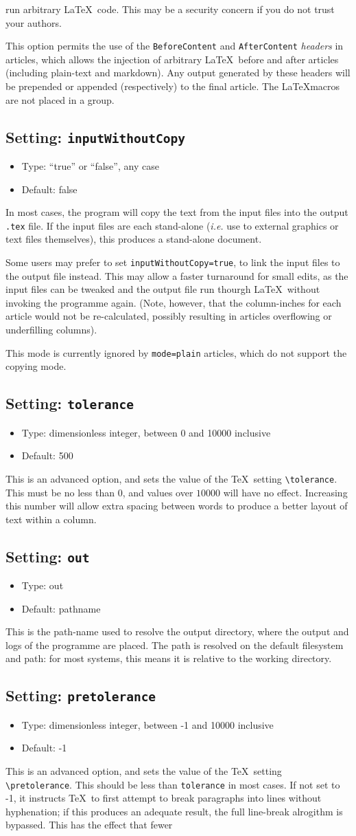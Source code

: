\documentclass[a4paper,DIV=11]{scrartcl}
\newcommand{\property}[5]{
  \subsection{#1: \texttt{#2}}
  \begin{itemize}
  \item Type: #3
  \item Default: #4
  \end{itemize}
  #5
}
\newcommand{\setting}{\property{Setting}}
\begin{document}
\begin{multicols}{2}
{  run arbitrary \LaTeX\ code. This may be a security concern if you do
  not trust your authors.\par
  This option permits the use of the \texttt{BeforeContent} and
  \texttt{AfterContent} \textit{headers} in articles, which allows the
  injection of arbitrary \LaTeX\ before and after articles (including
  plain-text and markdown). Any output generated by these headers will
  be prepended or appended (respectively) to the final article. The
  \LaTeX macros are not placed in a group.
}
\setting{inputWithoutCopy}{``true'' or ``false'', any case}{false}{
  In most cases, the program will copy the text from the input files
  into the output \texttt{.tex} file. If the input files are each
  stand-alone (\textit{i.e.} use to external graphics or text files
  themselves), this produces a stand-alone document. \par
  Some users may prefer to set \texttt{inputWithoutCopy=true}, to link
  the input files to the output file instead. This may allow a faster
  turnaround for small edits, as the input files can be tweaked and
  the output file run thourgh \LaTeX\ without invoking the programme
  again. (Note, however, that the column-inches for each article would
  not be re-calculated, possibly resulting in articles overflowing or
  underfilling columns).\par
  This mode is currently ignored by \texttt{mode=plain} articles,
  which do not support the copying mode.
}
\setting{tolerance}{dimensionless integer, between 0 and 10000 inclusive}{500}{
  This is an advanced option, and sets the value of the \TeX\ setting
  \texttt{\textbackslash tolerance}. This must be no less than $0$,
  and values over $10000$ will have no effect. Increasing this number
  will allow extra spacing between words to produce a better layout of
  text within a column.}  \setting{out}{out}{pathname}{This is the
  path-name used to resolve the output directory, where the output and
  logs of the programme are placed. The path is resolved on the
  default filesystem and path: for most systems, this means it is
  relative to the working directory.}
\setting{pretolerance}{dimensionless integer, between -1 and 10000 inclusive}{-1}{
  This is an advanced option, and sets the value of the \TeX\ setting
  \texttt{\textbackslash pretolerance}. This should be less than
  \texttt{tolerance} in most cases. If not set to -1, it instructs
  \TeX\ to first attempt to break paragraphs into lines without
  hyphenation; if this produces an adequate result, the full
  line-break alrogithm is bypassed. This has the effect that fewer
}
\end{multicols}
\end{document}
